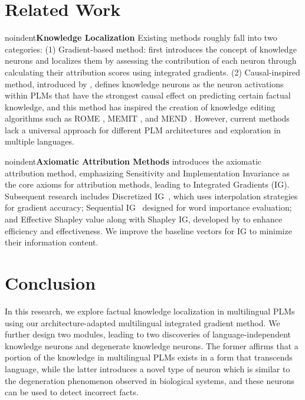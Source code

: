 \documentclass[]{article}
\newcommand{\vpara}[1]{noindent\textbf{#1 }}%
\begin{document}
\vspace{-1.00mm}
\section{Related Work}
\vpara{Knowledge Localization}
Existing methods roughly fall into two categories: (1) Gradient-based method: \citeauthor{dai2022kn} first introduces the concept of knowledge neurons and localizes them by assessing the contribution of each neuron \cite{key_value} through calculating their attribution scores using integrated gradients. (2) Causal-inspired method, introduced by \citeauthor{meng2022locating}, defines knowledge neurons as the neuron activations within PLMs that have the strongest causal effect on predicting certain factual knowledge, and this method has inspired the creation of knowledge editing algorithms such as ROME \cite{meng2022locating}, MEMIT \cite{meng2022memit}, and MEND \cite{mend}. However, current methods lack a universal approach for different PLM architectures and exploration in multiple languages.

\vpara{Axiomatic Attribution Methods}
\citeauthor{ig} introduces the axiomatic attribution method, emphasizing Sensitivity and Implementation Invariance as the core axioms for attribution methods, leading to Integrated Gradients (IG). Subsequent research includes Discretized IG~\cite{DIG}, which uses interpolation strategies for gradient accuracy; Sequential IG~\cite{enguehard2023sequential} designed for word importance evaluation; and Effective Shapley value along with Shapley IG, developed by \citeauthor{transparent} to enhance efficiency and effectiveness. We improve the baseline vectors for IG to minimize their information content.

\vspace{-0.99mm}
\section{Conclusion}
In this research, we explore factual knowledge localization in multilingual PLMs using our architecture-adapted multilingual integrated gradient method. We further design two modules, leading to two discoveries of language-independent knowledge neurons and degenerate knowledge neurons. The former affirms that a portion of the knowledge in multilingual PLMs exists in a form that transcends language, while the latter introduces a novel type of neuron which is similar to the degeneration phenomenon observed in biological systems, and these neurons can be used to detect incorrect facts.
\end{document}
